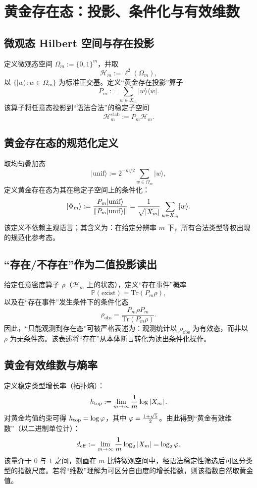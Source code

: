 \section{黄金存在态：投影、条件化与有效维数}

\subsection{微观态 Hilbert 空间与存在投影}

定义微观态空间 $\Omega_m:=\{0,1\}^m$，并取
\[
\mathcal H_m:=\ell^2(\Omega_m),
\]
以 $\{\lvert w\rangle:w\in\Omega_m\}$ 为标准正交基。定义“黄金存在投影”算子
\[
P_m:=\sum_{w\in X_m}\lvert w\rangle\langle w\rvert.
\]
该算子将任意态投影到“语法合法”的稳定子空间
\[
\mathcal H_m^{\mathrm{stab}}:=P_m\mathcal H_m.
\]

\subsection{黄金存在态的规范化定义}

取均匀叠加态
\[
\lvert\mathrm{unif}\rangle:=2^{-m/2}\sum_{w\in\Omega_m}\lvert w\rangle,
\]
定义黄金存在态为其在稳定子空间上的条件化：
\[
\lvert\Phi_m\rangle:=\frac{P_m\lvert\mathrm{unif}\rangle}{\left\lVert P_m\lvert\mathrm{unif}\rangle\right\rVert}
=\frac{1}{\sqrt{\left\lvert X_m\right\rvert}}\sum_{w\in X_m}\lvert w\rangle.
\]
该定义不依赖主观语言；其含义为：在给定分辨率 $m$ 下，所有合法类型等权出现的规范化参考态。

\subsection{“存在/不存在”作为二值投影读出}

给定任意密度算子 $\rho$（$\mathcal H_m$ 上的状态），定义“存在事件”概率
\[
\mathbb P(\mathrm{exist})=\mathrm{Tr}(P_m\rho),
\]
以及在“存在事件”发生条件下的条件化态
\[
\rho_{\mathrm{obs}}=\frac{P_m\rho P_m}{\mathrm{Tr}(P_m\rho)}.
\]
因此，“只能观测到存在态”可被严格表述为：观测统计以 $\rho_{\mathrm{obs}}$ 为有效态，而非以 $\rho$ 为无条件态。该表述将“存在”从本体断言转化为读出条件化操作。

\subsection{黄金有效维数与熵率}

定义稳定类型增长率（拓扑熵）：
\[
h_{\mathrm{top}}:=\lim_{m\to\infty}\frac{1}{m}\log \left\lvert X_m\right\rvert.
\]
对黄金均值约束可得 $h_{\mathrm{top}}=\log\varphi$，其中 $\varphi=\frac{1+\sqrt5}{2}$。由此得到“黄金有效维数”（以二进制单位计）：
\[
d_{\mathrm{eff}}:=\lim_{m\to\infty}\frac{1}{m}\log_2\left\lvert X_m\right\rvert=\log_2\varphi.
\]
该量介于 $0$ 与 $1$ 之间，刻画在 $m$ 比特微观空间中，经语法稳定性筛选后可区分类型的指数尺度。若将“维数”理解为可区分自由度的增长指数，则该指数自然取黄金值。

